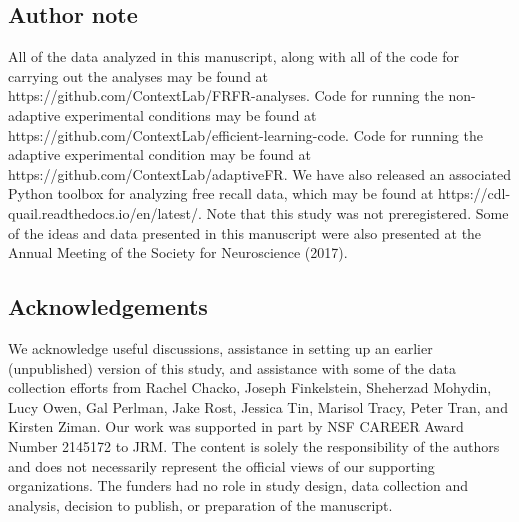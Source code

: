 \documentclass[11pt]{article}
\begin{document}
\subsection*{Author note}

All of the data analyzed in this manuscript, along with all of the code for
carrying out the analyses may be found at
https://github.com/ContextLab/FRFR-analyses. Code for running the non-adaptive
experimental conditions may be found at
https://github.com/Con\-text\-Lab/efficient-learning-code. Code for running the
adaptive experimental condition may be found at
https://github.com/ContextLab/adaptiveFR. We have also released an associated
Python toolbox for analyzing free recall data, which may be found at
https://cdl-quail.read\-the\-docs.io/\-en/\-latest/.  Note that this study was not
preregistered.  Some of the ideas and data presented in this manuscript
were also presented at the Annual Meeting of the Society for Neuroscience (2017).

\subsection*{Acknowledgements}

We acknowledge useful discussions, assistance in setting up an earlier
(unpublished) version of this study, and assistance with some of the data
collection efforts from Rachel Chacko, Joseph Finkelstein, Sheherzad Mohydin,
Lucy Owen, Gal Perlman, Jake Rost, Jessica Tin, Marisol Tracy,
Peter Tran, and Kirsten Ziman. Our work was supported in part by NSF CAREER Award Number
2145172 to JRM. The content is solely the responsibility of the authors and
does not necessarily represent the official views of our supporting
organizations. The funders had no role in study design, data collection and
analysis, decision to publish, or preparation of the manuscript.



\end{document}
